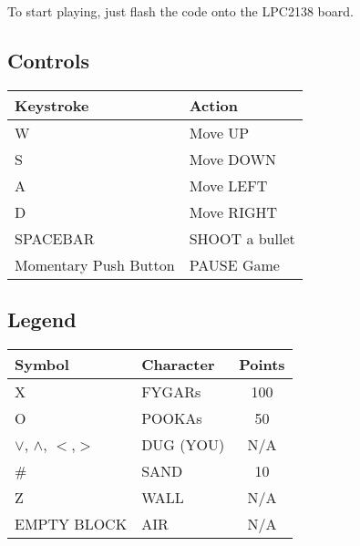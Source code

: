   To start playing, just flash the code onto the LPC2138 board.

  \subsection{Controls}

  \begin{table}[H]
  \centering
    \begin{tabular}{|l|l|}
    \hline
    Keystroke             & Action         \\ \hline
    W                     & Move UP        \\
    S                     & Move DOWN      \\
    A                     & Move LEFT      \\
    D                     & Move RIGHT     \\
    SPACEBAR              & SHOOT a bullet \\
    Momentary Push Button & PAUSE Game     \\ \hline
    \end{tabular}
  \end{table}

  \subsection{Legend}

  \begin{table}[H]
  \centering
    \begin{tabular}{|l|l|c|}
    \hline
    Symbol              &   Character           &   Points  \\ \hline
    X                   &   FYGARs              &   100     \\
    O                   &   POOKAs              &   50      \\
    $\lor$, $\wedge$, $<$,$>$         &   DUG (YOU)           &   N/A     \\
    \#                  &   SAND                &   10      \\
    Z                   &   WALL                &   N/A     \\
    EMPTY BLOCK         &   AIR                 &   N/A     \\ \hline
    \end{tabular}
  \end{table}
